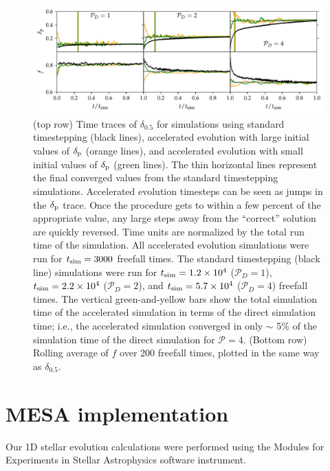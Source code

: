 \documentclass[twocolumn]{aastex631}
\newcommand{\delp}{\ensuremath{\delta_{\rm{p}}}}
\newcommand{\mP}{\ensuremath{\mathcal{P}}}
\begin{document}
\begin{figure}[t]
\centering
\includegraphics[width=\textwidth]{AE_time_figure.pdf}
\caption{
\label{fig:AE_time_figure}
(top row) Time traces of $\delta_{0.5}$ for simulations using standard timestepping (black lines), accelerated evolution with large initial values of $\delp$ (orange lines), and accelerated evolution with small initial values of $\delp$ (green lines).
The thin horizontal lines represent the final converged values from the standard timestepping simulations.
Accelerated evolution timesteps can be seen as jumps in the $\delp$ trace.
Once the procedure gets to within a few percent of the appropriate value, any large steps away from the ``correct'' solution are quickly reversed.
Time units are normalized by the total run time of the simulation.
All accelerated evolution simulations were run for $t_{\rm{sim}} = 3000$ freefall times.
The standard timestepping (black line) simulations were run for $t_{\rm{sim}} = 1.2 \times 10^4$ ($\mP_D = 1$), $t_{\rm{sim}} = 2.2 \times 10^4$ ($\mP_D = 2$), and $t_{\rm{sim}} = 5.7 \times 10^4$ ($\mP_D = 4$) freefall times.
The vertical green-and-yellow bars show the total simulation time of the accelerated simulation in terms of the direct simulation time; i.e., the accelerated simulation converged in only $\sim$ 5\% of the simulation time of the direct simulation for $\mP = 4$.
(Bottom row) Rolling average of $f$ over 200 freefall times, plotted in the same way as $\delta_{0.5}$.
}
\end{figure}





\section{MESA implementation}
\label{app:mesa}

Our 1D stellar evolution calculations were performed using the Modules for Experiments in Stellar Astrophysics software instrument\citep[MESA]{paxton_etal_2011, paxton_etal_2013, paxton_etal_2015, paxton_etal_2018, paxton_etal_2019}.
\end{document}
